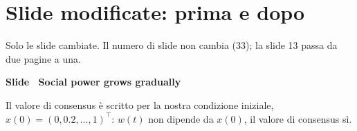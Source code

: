 \section*{Slide modificate: prima e dopo}
Solo le slide cambiate. Il numero di slide non cambia (33); la slide 13 passa da due pagine a una.
\par\addvspace{14pt}\noindent\begin{minipage}{\textwidth}
{\color{unipd}\bfseries Slide  \textperiodcentered\ Social power grows gradually}\par\smallskip
{\small Il valore di consensus è scritto per la nostra condizione iniziale, $x(0) = (0, 0.2, \dots, 1)^\top$: $w(t)$ non dipende da $x(0)$, il valore di consensus sì.}\par\smallskip
\noindent\begin{minipage}[t]{0.36\textwidth}\par
{}\par\smallskip
\end{minipage}\hfill\begin{minipage}[t]{0.61\textwidth}\par
{}\par\smallskip
\end{minipage}\par
\end{minipage}\par
